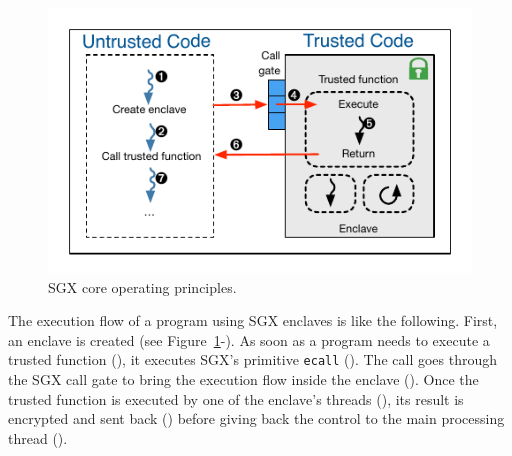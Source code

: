 \begin{figure}[!t]
  \centering
  \includegraphics[width=\linewidth]{images/sgx}
  \caption{SGX core operating principles.}
  \label{fig:sgx}
\end{figure}

The execution flow of a program using SGX enclaves is like the following.
First, an enclave is created (see Figure~\ref{fig:sgx}-).
As soon as a program needs to execute a trusted function (), it executes SGX's primitive \texttt{ecall} ().
The call goes through the SGX call gate to bring the execution flow inside the enclave ().
Once the trusted function is executed by one of the enclave's threads (), its result is encrypted and sent back () before giving back the control to the main processing thread ().
